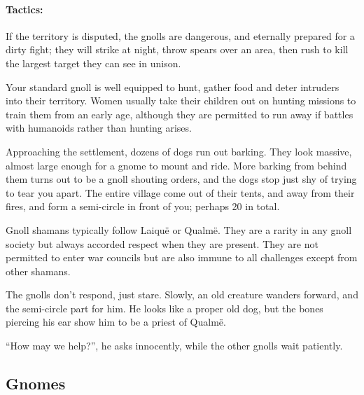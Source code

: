 \begin{multicols}{2}
\paragraph{Tactics:}If the territory is disputed, the gnolls are dangerous, and eternally prepared for a dirty fight; they will strike at night, throw spears over an area, then rush to kill the largest target they can see in unison.

Your standard gnoll is well equipped to hunt, gather food and deter intruders into their territory.
Women usually take their children out on hunting missions to train them from an early age, although they are permitted to run away if battles with humanoids rather than hunting arises.

\begin{boxtext}

	Approaching the settlement, dozens of dogs run out barking.
	They look massive, almost large enough for a gnome to mount and ride.
	More barking from behind them turns out to be a gnoll shouting orders, and the dogs stop just shy of trying to tear you apart.
	The entire village come out of their tents, and away from their fires, and form a semi-circle in front of you; perhaps 20 in total.

\end{boxtext}

\label{gnoll_shaman}

Gnoll shamans typically follow Laiqu\"{e} or Qualm\"{e}.  They are a rarity in any gnoll society but always accorded respect when they are present.  They are not permitted to enter war councils but are also immune to all challenges except from other shamans.


\begin{boxtext}

	The gnolls don't respond, just stare.	
	Slowly, an old creature wanders forward, and the semi-circle part for him.
	He looks like a proper old dog, but the bones piercing his ear show him to be a priest of Qualm\"{e}.

	``How may we help?'', he asks innocently, while the other gnolls wait patiently.

\end{boxtext}

\subsection{Gnomes}


\end{multicols}
